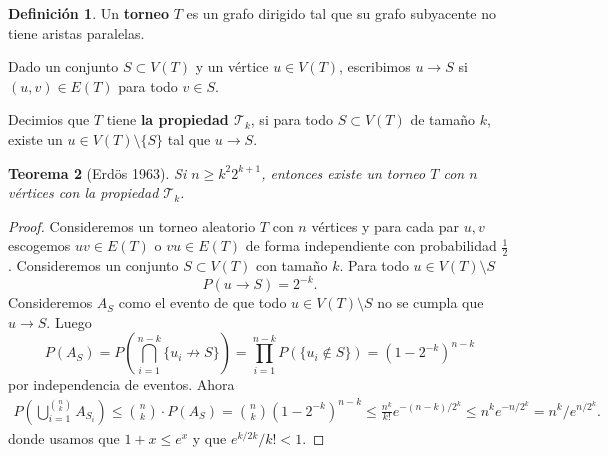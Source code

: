 \documentclass[12pt]{report}
\theoremstyle{plain}
\newtheorem{theorem}{Teorema}[section]
\theoremstyle{definition}
\newtheorem{definition}[theorem]{Definición}
\begin{document}
\begin{definition}
Un \textbf{torneo} $T$ es un grafo dirigido tal que su grafo subyacente no tiene aristas paralelas.

Dado un conjunto $S \subset V(T)$ y un vértice $u \in V(T)$, escribimos $u \to S$ si $(u,v) \in E(T)$ para todo $v \in S$.

Decimios que $T$ tiene \textbf{la propiedad $\mathcal T_k$}, si para todo $S \subset V(T)$ de tamaño $k$, existe un $u \in V(T) \setminus \{S\}$ tal que $u \to S$.
\end{definition}


\begin{theorem}[Erdös 1963]
Si $n \geq k^2 2^{k+1}$, entonces existe un torneo $T$ con $n$ vértices con la propiedad $\mathcal T_k$.

\end{theorem}
\begin{proof}
Consideremos un torneo aleatorio $T$ con $n$ vértices y para cada par $u,v$ escogemos $uv \in E(T)$ o $vu \in E(T)$ de forma independiente con probabilidad $\frac 1 2$. Consideremos un conjunto $S \subset V(T)$ con tamaño $k$. Para todo $u \in V(T) \setminus S$
\[
    P(u \to S) = 2^{-k}.
\]
Consideremos $A_S$ como el evento de que todo $u \in V(T) \setminus S$ no se cumpla que $u \to S$. Luego
\[
    P(A_S) = P(\bigcap_{i = 1}^{n-k} \{u_i \not \to S\}) = \prod_{i = 1}^{n-k} P(\{ u_i \not \in S \}) = (1 - 2^{-k})^{n-k}
\]
por independencia de eventos. Ahora
\begin{align*}
P(\bigcup_{i = 1}^{\binom n k} A_{S_i}) \leq \binom n k \cdot P(A_{S}) = \binom n k (1 - 2^{-k})^{n-k} \leq \frac{n^k}{k!} e^{-(n-k)/2^k} \leq n^k e^{-n /2^k} = n^k / e^{n/2^k}.
\end{align*}
donde usamos que $1 + x \leq e^x$ y que $e^{k/2k}/k! < 1$. 
\end{proof}
















%





\newpage


{}

\end{document}
